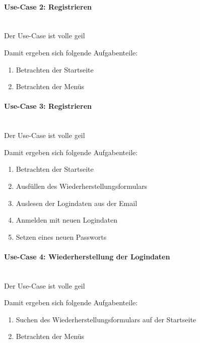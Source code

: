\paragraph{Use-Case 2: Registrieren}\quad\\
Der Use-Case ist volle geil

Damit ergeben sich folgende Aufgabenteile:
\begin{enumerate}

		\item Betrachten der Startseite
		\item Betrachten der Menüs
\end{enumerate}

\paragraph{Use-Case 3: Registrieren}\quad\\
Der Use-Case ist volle geil

Damit ergeben sich folgende Aufgabenteile:
\begin{enumerate}

		\item Betrachten der Startseite
		\item Ausfüllen des Wiederherstellungsformulars
		\item Auslesen der Logindaten aus der Email
		\item Anmelden mit neuen Logindaten
		\item Setzen eines neuen Passworts
\end{enumerate}


\paragraph{Use-Case 4: Wiederherstellung der Logindaten}\quad\\
Der Use-Case ist volle geil

Damit ergeben sich folgende Aufgabenteile:
\begin{enumerate}

		\item Suchen des Wiederherstellungsformulars auf der Startseite
		\item Betrachten der Menüs
\end{enumerate}


